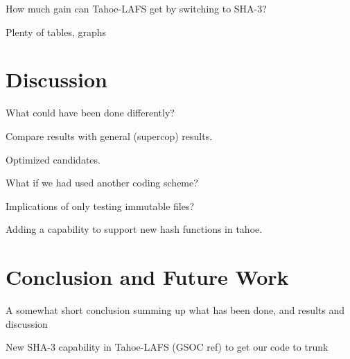 \documentclass[english,12pt,a4paper]{book}
\begin{document}
How much gain can Tahoe-LAFS get by switching to SHA-3?

Plenty of tables, graphs

\chapter{Discussion}

What could have been done differently?

Compare results with general (supercop) results.

Optimized candidates.

What if we had used another coding scheme?

Implications of only testing immutable files?

Adding a capability to support new hash functions in tahoe.

\chapter{Conclusion and Future Work}

A somewhat short conclusion summing up what has been done, and results and
discussion

New SHA-3 capability in Tahoe-LAFS (GSOC ref) to get our code to trunk






\end{document}
